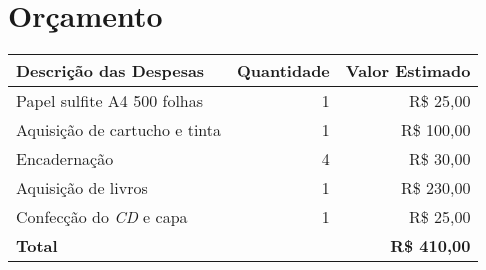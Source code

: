 \section{Orçamento}\label{lorcamento}

\begin{center}
  \tiny
  \begin{tabular}{| l | r | r |}
    \hline
      \textbf{Descrição das Despesas} & \textbf{Quantidade} & \textbf{Valor Estimado} \\
    \hline
      Papel sulfite A4 500 folhas & 1 & R\$ 25,00 \\
    \hline
      Aquisição de cartucho e tinta & 1 & R\$ 100,00 \\
    \hline
      Encadernação & 4 & R\$ 30,00 \\
    \hline
      Aquisição de livros & 1 & R\$ 230,00 \\
    \hline
      Confecção do \emph{CD} e capa & 1 & R\$ 25,00 \\
    \hline
      \textbf{Total} & & \textbf{R\$ 410,00} \\
  \hline
  \end{tabular}
\end{center}

